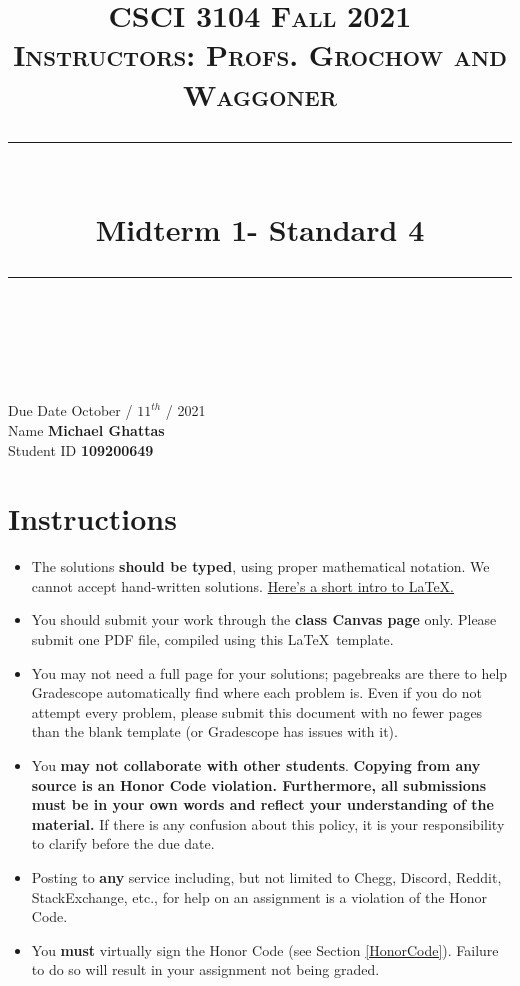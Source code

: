 \documentclass[11pt]{article}
\title{
\normalfont \normalsize 
\textsc{CSCI 3104 Fall 2021 \\ 
Instructors: Profs. Grochow and Waggoner} \\
[10pt] 
\rule{\linewidth}{0.5pt} \\[6pt] 
\huge Midterm 1- Standard 4 \\
\rule{\linewidth}{2pt}  \\[10pt]
}
\date{}
\theoremstyle{definition}
\theoremstyle{definition}
\theoremstyle{definition}
\begin{document}

\maketitle


\noindent
Due Date \dotfill October / $11^{th}$ / 2021 \\
Name \dotfill \textbf{Michael Ghattas} \\
Student ID \dotfill \textbf{109200649} \\


\tableofcontents

\section{Instructions}
 \begin{itemize}
	\item The solutions \textbf{should be typed}, using proper mathematical notation. We cannot accept hand-written solutions. \href{http://ece.uprm.edu/~caceros/latex/introduction.pdf}{Here's a short intro to \LaTeX.}
	\item You should submit your work through the \textbf{class Canvas page} only. Please submit one PDF file, compiled using this \LaTeX \ template.
	\item You may not need a full page for your solutions; pagebreaks are there to help Gradescope automatically find where each problem is. Even if you do not attempt every problem, please submit this document with no fewer pages than the blank template (or Gradescope has issues with it).

	\item You \textbf{may not collaborate with other students}. \textbf{Copying from any source is an Honor Code violation. Furthermore, all submissions must be in your own words and reflect your understanding of the material.} If there is any confusion about this policy, it is your responsibility to clarify before the due date. 

	\item Posting to \textbf{any} service including, but not limited to Chegg, Discord, Reddit, StackExchange, etc., for help on an assignment is a violation of the Honor Code.

	\item You \textbf{must} virtually sign the Honor Code (see Section \ref{HonorCode}). Failure to do so will result in your assignment not being graded.
\end{itemize}
\end{document}
